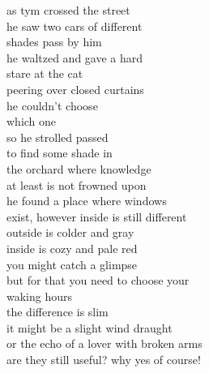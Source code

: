 as tym crossed the street\\
he saw two cars of different\\
shades pass by him\\
he waltzed and gave a hard\\
stare at the cat\\
peering over closed curtains\\
he couldn't choose\\
which one \\

so he strolled passed\\
to find some shade in\\
the orchard where knowledge\\
at least is not frowned upon\\
he found a place where windows\\
exist, however inside is still different\\
outside is colder and gray\\
inside is cozy and pale red\\
you might catch a glimpse\\
but for that you need to choose your\\
waking hours\\

the difference is slim\\
it might be a slight wind draught\\
or the echo of a lover with broken arms\\
are they still useful? why yes of course!\\
